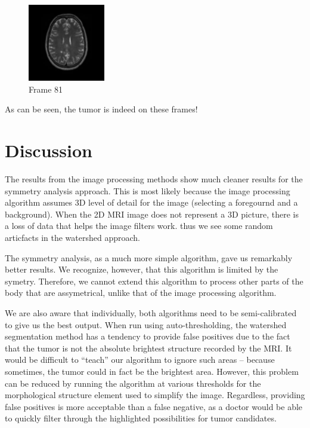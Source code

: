 \documentclass[12pt]{article}
\theoremstyle{plain}%
\theoremstyle{definition}
\theoremstyle{remark}
\begin{document}
\begin{figure}[!h]
	\centering
		\includegraphics[width=0.3\textwidth]{81.jpg}
	\caption{Frame 81}
\end{figure}

As can be seen, the tumor is indeed on these frames!

\section{Discussion}

The results from the image processing methods show much cleaner results for the symmetry analysis approach.  This is most likely because the image processing algorithm assumes 3D level of detail for the image (selecting a foregournd and a background).  When the 2D MRI image does not represent a 3D picture, there is a loss of data that helps the image filters work.  thus we see some random articfacts in the watershed approach.

The symmetry analysis, as a much more simple algorithm, gave us remarkably better results.  We recognize, however, that this algorithm is limited by the symetry.  Therefore, we cannot extend this algorithm to process other parts of the body that are assymetrical, unlike that of the image processing algorithm.

We are also aware that individually, both algorithms need to be semi-calibrated to give us the best output.  When run using auto-thresholding, the watershed segmentation method has a tendency to provide false positives due to the fact that the tumor is not the absolute brightest structure recorded by the MRI.  It would be difficult to “teach” our algorithm to ignore such areas – because sometimes, the tumor could in fact be the brightest area.  However, this problem can be reduced by running the algorithm at various thresholds for the morphological structure element used to simplify the image.  Regardless, providing false positives is more acceptable than a false negative, as a doctor would be able to quickly filter through the highlighted possibilities for tumor candidates.
\end{document}
